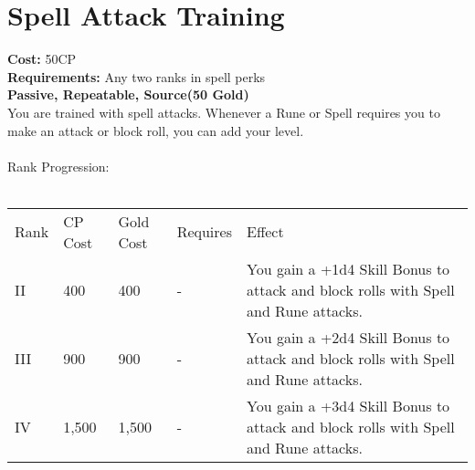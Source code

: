 \section{Spell Attack Training}\label{perk:spellAttackTraining}
\textbf{Cost:} 50CP\\
\textbf{Requirements:} Any two ranks in spell perks\\
\textbf{Passive, Repeatable, Source(50 Gold)}\\
You are trained with spell attacks.
Whenever a Rune or Spell requires you to make an attack or block roll, you can add your level.\\
\\
Rank Progression:\\
\\
\begin{tabular}{l | l | l | l | l}
	Rank & CP Cost & Gold Cost & Requires & Effect\\
	II & 400 & 400 & - & You gain a +1d4 Skill Bonus to attack and block rolls with Spell and Rune attacks.\\
	III & 900 & 900 & - & You gain a +2d4 Skill Bonus to attack and block rolls with Spell and Rune attacks.\\
	IV & 1,500 & 1,500 & - & You gain a +3d4 Skill Bonus to attack and block rolls with Spell and Rune attacks.\\
\end{tabular}